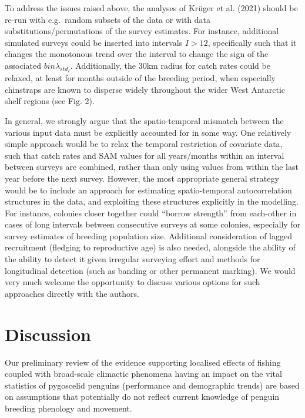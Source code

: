 \documentclass[]{elsarticle} %
\begin{document}
To address the issues raised above, the analyses of Krüger et al. (2021)
should be re-run with e.g.~random subsets of the data or with data
substitutions/permutations of the survey estimates. For instance,
additional simulated surveys could be inserted into intervals \(I>12\),
specifically such that it changes the monotonous trend over the interval
to change the sign of the associated \(bin\lambda_{std_I}\).
Additionally, the 30km radius for catch rates could be relaxed, at least
for months outside of the breeding period, when especially chinstraps
are known to disperse widely throughout the wider West Antarctic shelf
regions (see Fig. 2).

In general, we strongly argue that the spatio-temporal mismatch between
the various input data must be explicitly accounted for in some way. One
relatively simple approach would be to relax the temporal restriction of
covariate data, such that catch rates and SAM values for all
years/months within an interval between surveys are combined, rather
than only using values from within the last year before the next survey.
However, the most appropriate general strategy would be to include an
approach for estimating spatio-temporal autocorrelation structures in
the data, and exploiting these structures explicitly in the modelling.
For instance, colonies closer together could ``borrow strength'' from
each-other in cases of long intervals between consecutive surveys at
some colonies, especially for survey estimates of breeding population
size. Additional consideration of lagged recruitment (fledging to
reproductive age) is also needed, alongside the ability of the ability
to detect it given irregular surveying effort and methods for
longitudinal detection (such as banding or other permanent marking). We
would very much welcome the opportunity to discuss various options for
such approaches directly with the authors.

\hypertarget{discussion}{%
\section{Discussion}\label{discussion}}

Our preliminary review of the evidence supporting localised effects of
fishing coupled with broad-scale climactic phenomena having an impact on
the vital statistics of pygoscelid penguins (performance and demographic
trends) are based on assumptions that potentially do not reflect current
knowledge of penguin breeding phenology and movement.
\end{document}
